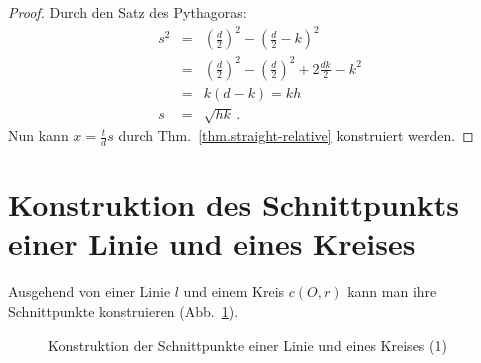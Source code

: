 \begin{proof}
Durch den Satz des Pythagoras:
\begin{eqnarray*}
s^2&=& \left(\frac{d}{2}\right)^2 - \left(\frac{d}{2}-k\right)^2\\
&=& \left(\frac{d}{2}\right)^2 - \left(\frac{d}{2}\right)^2 + 2\frac{dk}{2} - k^2\\
&=& k(d-k) = kh\\
s&=&\sqrt{hk}\,.
\end{eqnarray*}
Nun kann $x=\displaystyle\frac{t}{d}s$ durch Thm.~\ref{thm.straight-relative} konstruiert werden.
\end{proof}

\section{Konstruktion des Schnittpunkts einer Linie und eines Kreises}\label{s.line-circle-straight}

\begin{theorem}
Ausgehend von einer Linie $l$ und einem Kreis $c(O,r)$ kann man ihre Schnittpunkte konstruieren (Abb.~\ref{f.se-line-circle1}).
\end{theorem}
\begin{figure}[t]
\begin{center}
\end{center}
\caption{Konstruktion der Schnittpunkte einer Linie und eines Kreises (1)}\label{f.se-line-circle1}
\end{figure}

